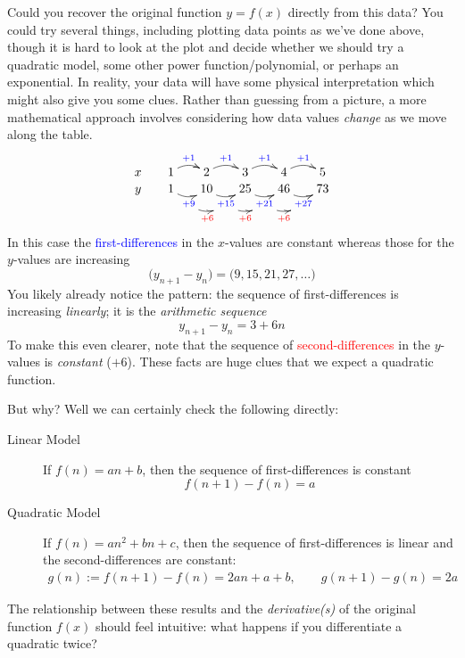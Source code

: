 Could you recover the original function $y=f(x)$ directly from this data? You could try several things, including plotting data points as we've done above, though it is hard to look at the plot and decide whether we should try a quadratic model, some other power function/polynomial, or perhaps an exponential. In reality, your data will have some physical interpretation which might also give you some clues.
\medbreak
Rather than guessing from a picture, a more mathematical approach involves considering how data values \emph{change} as we move along the table.
\[
	\xymatrix @R0pt @C15pt{
		x & 1 \ar@/^/[r]^{\textcolor{blue}{+1}} & 2 \ar@/^/[r]^{\textcolor{blue}{+1}} & 3 \ar@/^/[r]^{\textcolor{blue}{+1}} & 4 \ar@/^/[r]^{\textcolor{blue}{+1}} & 5\\
		y & 1 \ar@/_/[r]_{\textcolor{blue}{+9}}="a" & 10 \ar@/_/[r]_{\textcolor{blue}{+15}}="b" & 25 \ar@/_/[r]_{\textcolor{blue}{+21}}="c" & 46 \ar@/_/[r]_{\textcolor{blue}{+27}}="d" & 73
		\ar @/_/_{\textcolor{red}{+6}} "a";"b" \ar @/_/_{\textcolor{red}{+6}} "b";"c" \ar @/_/_{\textcolor{red}{+6}} "c";"d"
	}
\]
In this case the \textcolor{blue}{first-differences} in the $x$-values are constant whereas those for the $y$-values are increasing
\[\bigl(y_{n+1}-y_n\bigr)=\bigl(9,15,21,27,\ldots\bigr)\]
You likely already notice the pattern: the sequence of first-differences is increasing \emph{linearly}; it is the \emph{arithmetic sequence}
\[y_{n+1}-y_n=3+6n\]
To make this even clearer, note that the sequence of \textcolor{red}{second-differences} in the $y$-values is \emph{constant} ($+6$). These facts are huge clues that we expect a quadratic function.

\goodbreak

But why? Well we can certainly check the following directly: 
\begin{description}
  \item[Linear Model] If $f(n)=an+b$, then the sequence of first-differences is constant
  \[f(n+1)-f(n)=a\]
  \item[Quadratic Model] If $f(n)=an^2+bn+c$, then the sequence of first-differences is linear and the second-differences are constant:
  \begin{gather*}
  g(n):=f(n+1)-f(n)=2an+a+b,\qquad g(n+1)-g(n)=2a
  \end{gather*}
\end{description}
  
The relationship between these results and the \emph{derivative(s)} of the original function $f(x)$ should feel intuitive: what happens if you differentiate a quadratic twice?

